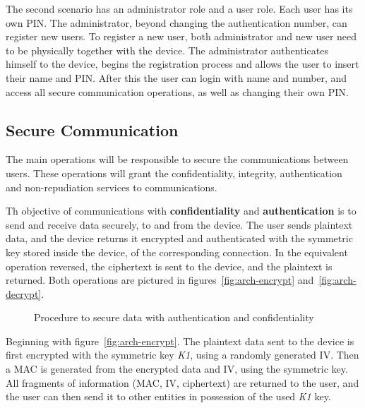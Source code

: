 The second scenario has an administrator role and a user role. Each user has its own \ac{PIN}. The administrator, beyond changing the authentication number, can register new users. To register a new user, both administrator and new user need to be physically together with the device. The administrator authenticates himself to the device, begins the registration process and allows the user to insert their name and \ac{PIN}. After this the user can login with name and number, and access all secure communication operations, as well as changing their own \ac{PIN}.

\subsection{Secure Communication}\label{chap:arch:ops:comms}

The main operations will be responsible to secure the communications between users. These operations will grant the confidentiality, integrity, authentication and non-repudiation services to communications.

Th objective of communications with \textbf{confidentiality} and \textbf{authentication} is to send and receive data securely, to and from the device. The user sends plaintext data, and the device returns it encrypted and authenticated with the symmetric key stored inside the device, of the corresponding connection. In the equivalent operation reversed, the ciphertext is sent to the device, and the plaintext is returned.
Both operations are pictured in figures~\ref{fig:arch-encrypt} and~\ref{fig:arch-decrypt}.

\begin{figure}[h]
	\centering     %
	\caption{Procedure to secure data with authentication and confidentiality}
\end{figure}

Beginning with figure~\ref{fig:arch-encrypt}. The plaintext data sent to the device is first encrypted with the symmetric key \textit{K1}, using a randomly generated \ac{IV}. Then a \ac{MAC} is generated from the encrypted data and \ac{IV}, using the symmetric key. All fragments of information (MAC, IV, ciphertext) are returned to the user, and the user can then send it to other entities in possession of the used \textit{K1} key.

